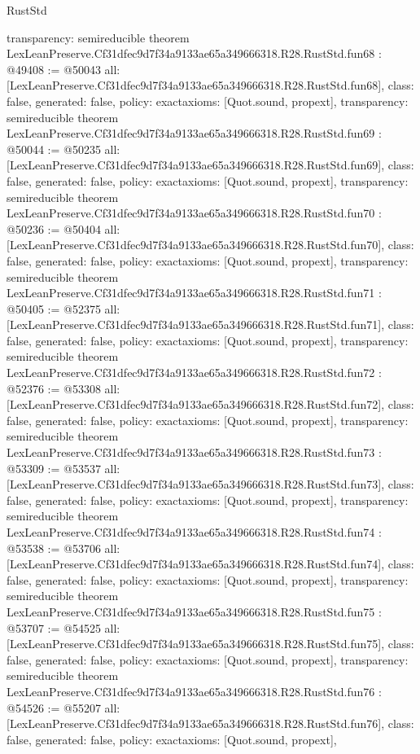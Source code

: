\begin{lexlean}{RustStd}
\begin{coremodule}
{  transparency: semireducible
}
theorem LexLeanPreserve.Cf31dfec9d7f34a9133ae65a349666318.R28.RustStd.fun68 : @49408 := @50043 {
  all: [LexLeanPreserve.Cf31dfec9d7f34a9133ae65a349666318.R28.RustStd.fun68],
  class: false,
  generated: false,
  policy: exact{axioms: [Quot.sound, propext]},
  transparency: semireducible
}
theorem LexLeanPreserve.Cf31dfec9d7f34a9133ae65a349666318.R28.RustStd.fun69 : @50044 := @50235 {
  all: [LexLeanPreserve.Cf31dfec9d7f34a9133ae65a349666318.R28.RustStd.fun69],
  class: false,
  generated: false,
  policy: exact{axioms: [Quot.sound, propext]},
  transparency: semireducible
}
theorem LexLeanPreserve.Cf31dfec9d7f34a9133ae65a349666318.R28.RustStd.fun70 : @50236 := @50404 {
  all: [LexLeanPreserve.Cf31dfec9d7f34a9133ae65a349666318.R28.RustStd.fun70],
  class: false,
  generated: false,
  policy: exact{axioms: [Quot.sound, propext]},
  transparency: semireducible
}
theorem LexLeanPreserve.Cf31dfec9d7f34a9133ae65a349666318.R28.RustStd.fun71 : @50405 := @52375 {
  all: [LexLeanPreserve.Cf31dfec9d7f34a9133ae65a349666318.R28.RustStd.fun71],
  class: false,
  generated: false,
  policy: exact{axioms: [Quot.sound, propext]},
  transparency: semireducible
}
theorem LexLeanPreserve.Cf31dfec9d7f34a9133ae65a349666318.R28.RustStd.fun72 : @52376 := @53308 {
  all: [LexLeanPreserve.Cf31dfec9d7f34a9133ae65a349666318.R28.RustStd.fun72],
  class: false,
  generated: false,
  policy: exact{axioms: [Quot.sound, propext]},
  transparency: semireducible
}
theorem LexLeanPreserve.Cf31dfec9d7f34a9133ae65a349666318.R28.RustStd.fun73 : @53309 := @53537 {
  all: [LexLeanPreserve.Cf31dfec9d7f34a9133ae65a349666318.R28.RustStd.fun73],
  class: false,
  generated: false,
  policy: exact{axioms: [Quot.sound, propext]},
  transparency: semireducible
}
theorem LexLeanPreserve.Cf31dfec9d7f34a9133ae65a349666318.R28.RustStd.fun74 : @53538 := @53706 {
  all: [LexLeanPreserve.Cf31dfec9d7f34a9133ae65a349666318.R28.RustStd.fun74],
  class: false,
  generated: false,
  policy: exact{axioms: [Quot.sound, propext]},
  transparency: semireducible
}
theorem LexLeanPreserve.Cf31dfec9d7f34a9133ae65a349666318.R28.RustStd.fun75 : @53707 := @54525 {
  all: [LexLeanPreserve.Cf31dfec9d7f34a9133ae65a349666318.R28.RustStd.fun75],
  class: false,
  generated: false,
  policy: exact{axioms: [Quot.sound, propext]},
  transparency: semireducible
}
theorem LexLeanPreserve.Cf31dfec9d7f34a9133ae65a349666318.R28.RustStd.fun76 : @54526 := @55207 {
  all: [LexLeanPreserve.Cf31dfec9d7f34a9133ae65a349666318.R28.RustStd.fun76],
  class: false,
  generated: false,
  policy: exact{axioms: [Quot.sound, propext]},
}
\end{coremodule}
\end{lexlean}
